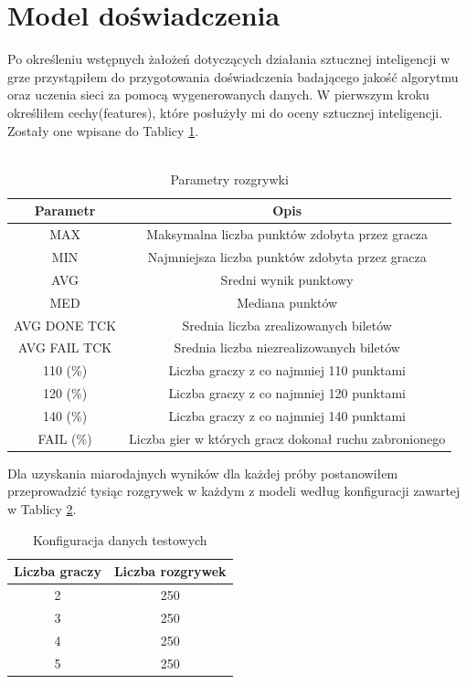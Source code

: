 \documentclass[12pt, oneside]{report}
\begin{document}
\section{Model doświadczenia}
Po określeniu wstępnych żałożeń dotyczących działania sztucznej inteligencji w grze przystąpiłem do przygotowania doświadczenia badającego jakość algorytmu oraz uczenia sieci za pomocą wygenerowanych danych. W pierwszym kroku określiłem cechy(features), które posłużyły mi do oceny sztucznej inteligencji. Zostały one wpisane do Tablicy \ref{table:outputparam}. \\ \\
\begin{table}[h]
	\begin{center}
		\begin{tabular}{| c | c |} \hline
			Parametr  & Opis \\ \hline
			MAX & Maksymalna liczba punktów zdobyta przez gracza \\ \hline
			MIN & Najmniejsza liczba punktów zdobyta przez gracza \\ \hline
			AVG & Sredni wynik punktowy \\ \hline
			MED & Mediana punktów \\ \hline
			AVG DONE TCK & Srednia liczba zrealizowanych biletów \\ \hline
			AVG FAIL TCK & Srednia liczba niezrealizowanych biletów \\ \hline
			110 (\%) & Liczba graczy z co najmniej 110 punktami \\ \hline
			120 (\%) & Liczba graczy z co najmniej 120 punktami \\ \hline
			140 (\%) & Liczba graczy z co najmniej 140 punktami \\ \hline
			FAIL (\%) & Liczba gier w których gracz dokonał ruchu zabronionego \\ \hline
		\end{tabular}
		\caption{Parametry rozgrywki}
		\label{table:outputparam}
	\end{center}
\end{table}
Dla uzyskania miarodajnych wyników dla każdej próby postanowiłem przeprowadzić tysiąc rozgrywek w każdym z modeli według konfiguracji zawartej w Tablicy \ref{table:gameconfig}. 
\begin{table}[h]
	\begin{center}
		\begin{tabular}{| c | c |} \hline
			Liczba graczy & Liczba rozgrywek \\ \hline
			2 & 250 \\ \hline
			3 & 250 \\ \hline
			4 & 250 \\ \hline
			5 & 250 \\ \hline
		\end{tabular}
		\caption{Konfiguracja danych testowych}
		\label{table:gameconfig}
	\end{center}
\end{table}
\end{document}
